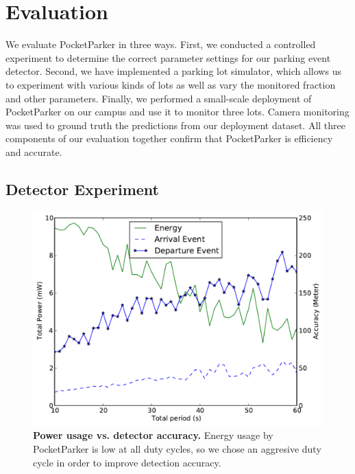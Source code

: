 \section{Evaluation}
\label{sec-evaluation}

We evaluate PocketParker in three ways. First, we conducted a controlled
experiment to determine the correct parameter settings for our parking event
detector. Second, we have implemented a parking lot simulator, which allows
us to experiment with various kinds of lots as well as vary the monitored
fraction and other parameters. Finally, we performed a small-scale deployment
of PocketParker on our campus and use it to monitor three lots. Camera
monitoring was used to ground truth the predictions from our deployment
dataset. All three components of our evaluation together confirm that
PocketParker is efficiency and accurate.

\subsection{Detector Experiment}

\begin{figure}
\centering
\includegraphics[width=\columnwidth]{./figures/Energy_accuracy.pdf}

\caption{\textbf{Power usage vs. detector accuracy.} Energy usage by
PocketParker is low at all duty cycles, so we chose an aggresive duty cycle
in order to improve detection accuracy.}

\label{fig-energy}
\end{figure}



